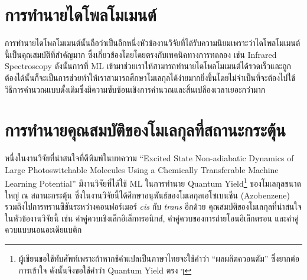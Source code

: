 \section{การทำนายไดโพลโมเมนต์}
\label{sec:pred_dipole_moment}

การทำนายไดโพลโมเมนต์นั้นถือว่าเป็นอีกหนึ่งหัวข้องานวิจัยที่ได้รับความนิยมเพราะว่าไดโพลโมเมนต์นี้เป็นคุณสมบัติที่สำคัญมาก ซึ่งเกี่ยวข้องโดยโดยตรงกับเทคนิคทางการทดลอง เช่น Infrared Spectroscopy ดังนั้นการที่ ML เข้ามาช่วยเราให้สามารถทำนายไดโพลโมเมนต์ได้รวดเร็วและถูกต้องได้นั้นก็จะเป็นการช่วยทำให้เราสามารถศึกษาโมเลกุลได้ง่ายมากยิ่งขึ้นโดยไม่จำเป็นที่จะต้องไปใช้วิธีการคำนวณแบบดั้งเดิมซึ่งมีความซับซ้อนเชิงการคำนวณและสิ้นเปลืองเวลาเยอะกว่ามาก\autocite{knijff2021,liu2020,pereira2018,staacke2022,sun2022,veit2020,vo2019}

\section{การทำนายคุณสมบัติของโมเลกุลที่สถานะกระตุ้น}
\label{sec:pred_ex_prop}

หนึ่งในงานวิจัยที่น่าสนใจที่ตีพิมพ์ในบทความ \enquote{Excited State Non-adiabatic Dynamics of Large Photoswitchable Molecules Using a Chemically Transferable Machine Learning Potential}\autocite{axelrod2022} มีงานวิจัยที่ได้ใช้ ML ในการทำนาย Quantum Yield\footnote{ผู้เขียนขอใช้ทับศัพท์เพราะถ้าหากช้คำแปลเป็นภาษาไทยจะใช้คำว่า \enquote{ผลผลิตควอนตัม} ซึ่งยากต่อการเข้าใจ ดังนั้นจึงขอใช้คำว่า Quantum Yield ตรง ๆ} ของโมเลกุลขนาดใหญ่ ณ สถานะกระตุ้น ซึ่งในงานวิจัยนี้ได้ศึกษาอนุพันธ์ของโมเลกุลเอโซเบนซีน (Azobenzene) รวมถึงไปการทรานซิชันระหว่างคอนฟอร์เมอร์ \textit{cis} กับ \textit{trans} อีกด้วย คุณสมบัติของโมเลกุลที่น่าสนใจในหัวข้องานวิจัยนี้ เช่น ค่าคู่ควบเชิงเล็กอิเล็กทรอนิกส์, ค่าคู่ควบของการถ่ายโอนอิเล็กตรอน และค่าคู่ควบแบบนอนอะเดียแบติก

